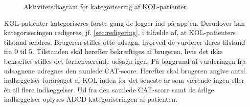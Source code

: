 \begin{figure} [H]
\caption{Aktivitetsdiagram for kategorisering af KOL-patienter.}
\label{fig:Kate}
\end{figure}

KOL-patienter kategoriseres første gang de logger ind på app'en. Derudover kan kategoriseringen redigeres, jf. \autoref{sec:redigering}, i tilfælde af, at KOL-patienters tilstand ændres.
Brugeren stilles otte udsagn, hvorved de vurderer deres tilstand fra 0 til 5. Tilstanden skal herefter bekræftiges af brugeren, hvis det ikke bekræftes stilles det førhenværende udsagn igen. På baggrund af vurderingen fra udsagnene udregnes den samlede CAT-score. Herefter skal brugeren angive antal indlæggelser forårsaget af KOL inden for det seneste år som værende ingen eller én til flere indlæggelser. Ud fra den samlede CAT-score samt de årlige indlæggelser oplyses ABCD-kategoriseringen af patienten. 
